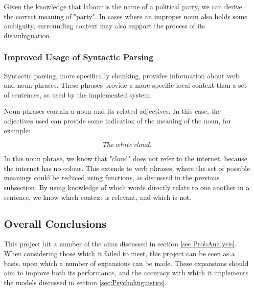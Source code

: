 \documentclass[]{article}
\begin{document}
Given the knowledge that labour is the name of a political party, we can derive the correct meaning of "party". In cases where an improper noun also holds some ambiguity, surrounding context may also support the process of its disambiguation.




\subsubsection{Improved Usage of Syntactic Parsing}
\label{sec:FutureSyntactic}
Syntactic parsing, more specifically chunking, provides information about verb and noun phrases. These phrases provide a more specific local context than a set of sentences, as used by the implemented system. 

Noun phrases contain a noun and its related adjectives. In this case, the adjectives used can provide some indication of the meaning of the noun, for example:

\[The\: white\: cloud.\]

In this noun phrase, we know that "cloud" does not refer to the internet, because the internet has no colour. This extends to verb phrases, where the set of possible meanings could be reduced using functions, as discussed in the previous subsection. By using knowledge of which words directly relate to one another in a sentence, we know which context is relevant, and which is not.

\subsection{Overall Conclusions}
\label{sec:OverallConc}
This project hit a number of the aims discussed in section \ref{sec:ProbAnalysis}. When considering those which it failed to meet, this project can be seen as a basis, upon which a number of expansions can be made. These expansions should aim to improve both its performance, and the accuracy with which it implements the models discussed in section \ref{sec:Psycholinguistics}. 


\newpage



\newpage
\appendix
\end{document}
